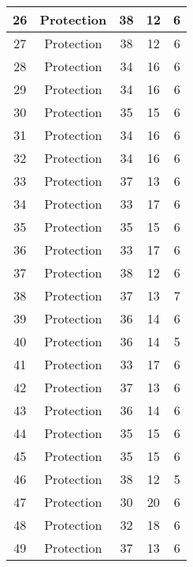 \documentclass[results.tex]{subfiles}
\begin{document}
\begin{center}
\begin{tabular}{| c || c | c | c | c |}
    \hline
    26 & Protection & 38 & 12 & 6 \\ 
    \hline
    27 & Protection & 38 & 12 & 6 \\ 
    \hline
    28 & Protection & 34 & 16 & 6 \\ 
    \hline
    29 & Protection & 34 & 16 & 6 \\ 
    \hline
    30 & Protection & 35 & 15 & 6 \\ 
    \hline
    31 & Protection & 34 & 16 & 6 \\ 
    \hline
    32 & Protection & 34 & 16 & 6 \\ 
    \hline
    33 & Protection & 37 & 13 & 6 \\ 
    \hline
    34 & Protection & 33 & 17 & 6 \\ 
    \hline
    35 & Protection & 35 & 15 & 6 \\ 
    \hline
    36 & Protection & 33 & 17 & 6 \\ 
    \hline
    37 & Protection & 38 & 12 & 6 \\ 
    \hline
    38 & Protection & 37 & 13 & 7 \\ 
    \hline
    39 & Protection & 36 & 14 & 6 \\ 
    \hline
    40 & Protection & 36 & 14 & 5 \\ 
    \hline
    41 & Protection & 33 & 17 & 6 \\ 
    \hline
    42 & Protection & 37 & 13 & 6 \\ 
    \hline
    43 & Protection & 36 & 14 & 6 \\ 
    \hline
    44 & Protection & 35 & 15 & 6 \\ 
    \hline
    45 & Protection & 35 & 15 & 6 \\ 
    \hline
    46 & Protection & 38 & 12 & 5 \\ 
    \hline
    47 & Protection & 30 & 20 & 6 \\ 
    \hline
    48 & Protection & 32 & 18 & 6 \\ 
    \hline
    49 & Protection & 37 & 13 & 6 \\ 
    \hline   \end{tabular}
\end{center}
\end{document}

